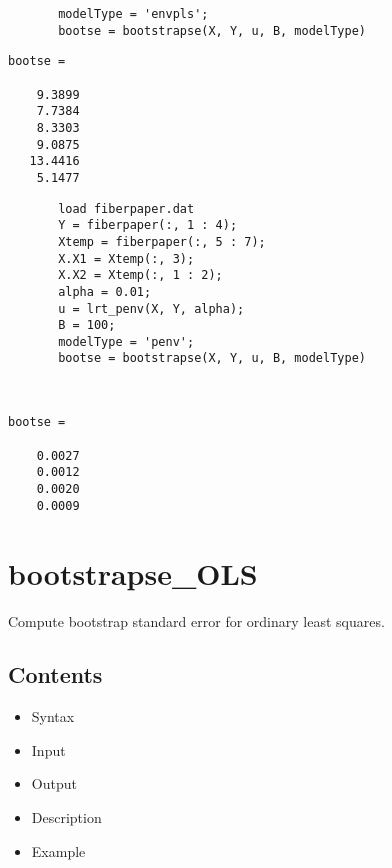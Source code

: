 \documentclass[a4paper,11pt,openany]{memoir}
\begin{document}
\begin{verbatim}       modelType = 'envpls';
       bootse = bootstrapse(X, Y, u, B, modelType)
       \end{verbatim}
   
        \color{lightgray}\ttfamily \begin{verbatim}
bootse =

    9.3899
    7.7384
    8.3303
    9.0875
   13.4416
    5.1477
\end{verbatim} \rmfamily

\color{black}
\begin{verbatim}       load fiberpaper.dat
       Y = fiberpaper(:, 1 : 4);
       Xtemp = fiberpaper(:, 5 : 7);
       X.X1 = Xtemp(:, 3);
       X.X2 = Xtemp(:, 1 : 2);
       alpha = 0.01;
       u = lrt_penv(X, Y, alpha);
       B = 100;
       modelType = 'penv';
       bootse = bootstrapse(X, Y, u, B, modelType)
       \end{verbatim}
    

        \color{lightgray}\ttfamily \begin{verbatim}


bootse =

    0.0027
    0.0012
    0.0020
    0.0009

\end{verbatim} \rmfamily
\color{black}
    

\newpage

\rmfamily
\color{black}\section{bootstrapse\_OLS}

\begin{par}
Compute bootstrap standard error for ordinary least squares.
\end{par} \vspace{1em}

\subsection*{Contents}

\begin{itemize}
\setlength{\itemsep}{-1ex}
   \item Syntax
   \item Input
   \item Output
   \item Description
   \item Example
\end{itemize}
\end{document}
